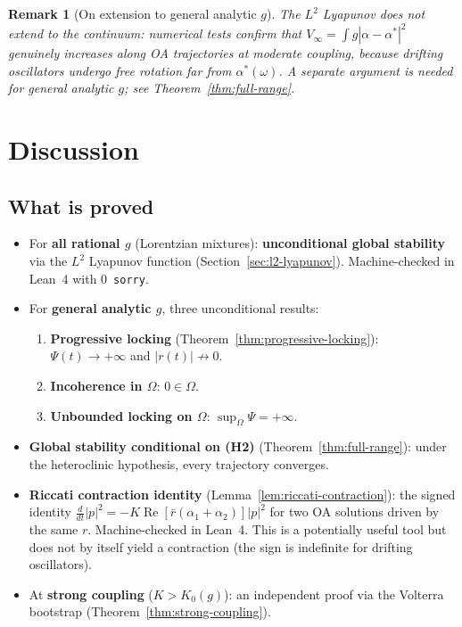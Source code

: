 \documentclass[11pt,a4paper]{article}
\newtheorem{remark}[theorem]{Remark}
\theoremstyle{definition}
\DeclareMathOperator{\re}{Re}
\begin{document}
\begin{remark}[On extension to general analytic $g$]
The $L^2$ Lyapunov does \emph{not} extend to the continuum: numerical tests confirm that $V_\infty = \int g|\alpha - \alpha^*|^2$ genuinely increases along OA trajectories at moderate coupling, because drifting oscillators undergo free rotation far from $\alpha^*(\omega)$. A separate argument is needed for general analytic $g$; see Theorem~\ref{thm:full-range}.
\end{remark}

\section{Discussion}

\subsection{What is proved}
\begin{itemize}
\item For \textbf{all rational $g$} (Lorentzian mixtures): \textbf{unconditional global stability} via the $L^2$ Lyapunov function (Section~\ref{sec:l2-lyapunov}). Machine-checked in Lean~4 with 0~\texttt{sorry}.
\item For \textbf{general analytic $g$}, three unconditional results:
  \begin{enumerate}[label=(\roman*)]
  \item \textbf{Progressive locking} (Theorem~\ref{thm:progressive-locking}): $\Psi(t) \to +\infty$ and $|r(t)| \not\to 0$.
  \item \textbf{Incoherence in $\Omega$}: $0 \in \Omega$.
  \item \textbf{Unbounded locking on $\Omega$}: $\sup_\Omega\Psi = +\infty$.
  \end{enumerate}
\item \textbf{Global stability conditional on (H2)} (Theorem~\ref{thm:full-range}): under the heteroclinic hypothesis, every trajectory converges.
\item \textbf{Riccati contraction identity} (Lemma~\ref{lem:riccati-contraction}): the signed identity $\frac{d}{dt}|p|^2 = -K\re[\bar{r}(\alpha_1+\alpha_2)]|p|^2$ for two OA solutions driven by the same $r$. Machine-checked in Lean~4. This is a potentially useful tool but does not by itself yield a contraction (the sign is indefinite for drifting oscillators).
\item At \textbf{strong coupling} ($K > K_0(g)$): an independent proof via the Volterra bootstrap (Theorem~\ref{thm:strong-coupling}).
\end{itemize}
\end{document}
